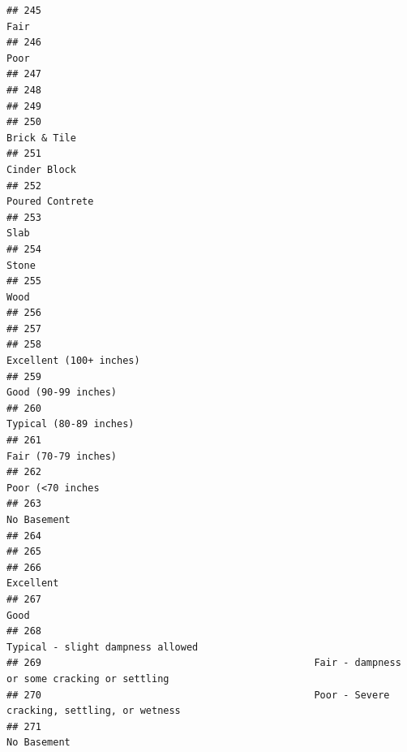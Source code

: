 \documentclass[
]{article}
\begin{document}
\begin{verbatim}
## 245                                                                                       Fair
## 246                                                                                       Poor
## 247                                                                                           
## 248                                                                                           
## 249                                                                                           
## 250                                                                               Brick & Tile
## 251                                                                               Cinder Block
## 252                                                                            Poured Contrete
## 253                                                                                       Slab
## 254                                                                                      Stone
## 255                                                                                       Wood
## 256                                                                                           
## 257                                                                                           
## 258                                                                    Excellent (100+ inches)
## 259                                                                        Good (90-99 inches)
## 260                                                                     Typical (80-89 inches)
## 261                                                                        Fair (70-79 inches)
## 262                                                                           Poor (<70 inches
## 263                                                                                No Basement
## 264                                                                                           
## 265                                                                                           
## 266                                                                                  Excellent
## 267                                                                                       Good
## 268                                                          Typical - slight dampness allowed
## 269                                               Fair - dampness or some cracking or settling
## 270                                               Poor - Severe cracking, settling, or wetness
## 271                                                                                No Basement

\end{verbatim}
\end{document}
